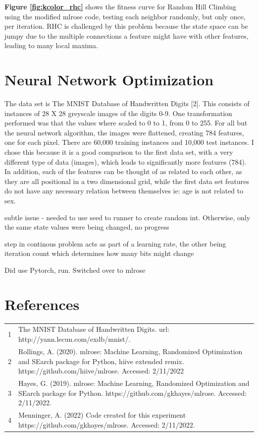 \documentclass[letterpaper]{article} %
\begin{document}
\textbf{Figure \ref{fig:kcolor_rhc}} shows the fitness curve for Random Hill Climbing using the modified mlrose code, testing each neighbor randomly, but only once, per iteration.  RHC is challenged by this problem because the state space can be jumpy due to the multiple connections a feature might have with other features, leading to many local maxima.  


\section{Neural Network Optimization}

The data set is The MNIST Database of Handwritten Digits [2].  This consists of instances of 28 X 28 greyscale images of the digits 0-9.  One transformation performed was that the values where scaled to 0 to 1, from 0 to 255.  For all but the neural network algorithm,  the images were flattened, creating 784 features, one for each pixel.  There are 60,000 training instances and 10,000 test instances.  I chose this because it is a good comparison to the first data set, with a very different type of data (images), which leads to significantly more features (784).  In addition, each of the features can be thought of as related to each other, as they are all positional in a two dimensional grid, while the first data set features do not have any necessary relation between themselves ie:  age is not related to sex.  

subtle issue - needed to use seed to runner to create random int.  Otherwise, only the same state values were being changed, no progress

step in continous problem acts as part of a learning rate, the other being iteration count which determines how many bits might change

Did use Pytorch, run.  Switched over to mlrose


\section{References}
\begin{tabular}{l p{2.75in}}
\\
1 & The MNIST Database of Handwritten Digits. url: http://yann.lecun.com/exdb/mnist/.
\\
2 & Rollings, A. (2020). mlrose: Machine Learning, Randomized Optimization and SEarch package for Python, hiive extended remix. https://github.com/hiive/mlrose. Accessed: 2/11/2022
\\
3 & Hayes, G. (2019). mlrose: Machine Learning, Randomized Optimization and SEarch package for Python. https://github.com/gkhayes/mlrose. Accessed: 2/11/2022.
\\
4 & Menninger, A. (2022)  Code created for this experiment https://github.com/gkhayes/mlrose. Accessed: 2/11/2022.
\end{tabular}
\end{document}
